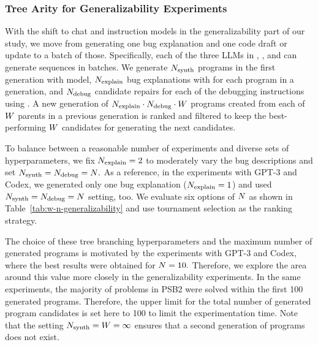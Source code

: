 \subsubsection{Tree Arity for \method{} Generalizability Experiments}
\label{sec:seidr-tree-arity-ollama} 
With the shift to chat and instruction models in the generalizability part of our study, we move from generating one bug explanation and one code draft or update to a batch of those. 
Specifically, each of the three LLMs in \synthesize{}, \instruct{}, and \debug{}  can generate sequences in batches. 
We generate $N_\text{synth}{}$ programs in the first generation with \synthmodelnoargs{} model, $N_\text{explain}{}$ bug explanations with \textmodelnoargs{} for each program in a generation, and $N_\text{debug}{}$ candidate repairs for each of the debugging instructions using \debugmodelnoargs{}.
A new generation of $N_\text{explain}{} \cdot N_\text{debug}{} \cdot W{}$ programs created from each of $ W{}$ parents in a previous generation is ranked and filtered to keep the best-performing $W{}$ candidates for generating the next candidates. 

To balance between a reasonable number of experiments and diverse sets of hyperparameters, we fix $N_\text{explain}{}=2$ to moderately vary the bug descriptions and set $N_\text{synth}{} = N_\text{debug}{} = N{}.$
As a reference, in the experiments with GPT-3 and Codex, we generated only one bug explanation ($N_\text{explain}{} = 1$) and used $N_\text{synth}{} = N_\text{debug}{} = N{}$ setting, too. 
We evaluate six options of $N{}$ 
as shown in Table~\ref{tab:w-n-generalizability} and use tournament selection as the ranking strategy. 

The choice of these tree branching hyperparameters and the maximum number of generated programs is motivated by the experiments with GPT-3 and Codex, where the best results were obtained for $N{}=10.$ 
Therefore, we explore the area around this value more closely in the generalizability experiments.
In the same experiments, the majority of problems in PSB2 were solved within the first 100 generated programs.
Therefore, the upper limit for the total number of generated program candidates is set here to 100 to limit the experimentation time.
Note that the setting $N_\text{synth}{}=W{}=\infty$ ensures that a second generation of programs does not exist.

